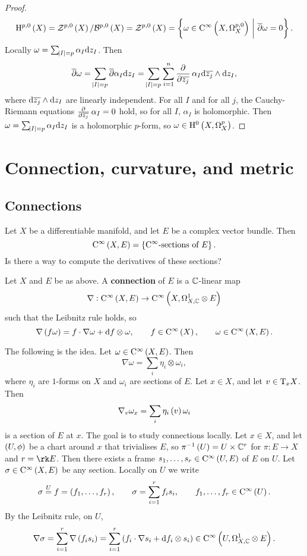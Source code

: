 \begin{proof}
$$ \H^{p, 0}\br{X} = \ZZZ^{p, 0}\br{X} / \BBB^{p, 0}\br{X} = \ZZZ^{p, 0}\br{X} = \cbr{\omega \in \C^\infty\br{X, \Omega_X^{p, 0}} \st \overline{\partial}\omega = 0}. $$
Locally $ \omega = \sum_{\abs{I} = p} \alpha_I\mathrm{d} z_I $. Then
$$ \overline{\partial}\omega = \sum_{\abs{I} = p} \overline{\partial}\alpha_I \d z_I = \sum_{\abs{I} = p} \sum_{i = 1}^n \dpd{}{\overline{z_j}}\alpha_I \d\overline{z_j} \wedge \d z_I, $$
where $ \mathrm{d}\overline{z_j} \wedge \mathrm{d} z_I $ are linearly independent. For all $ I $ and for all $ j $, the Cauchy-Riemann equations $ \tpd{}{\overline{z_j}}\alpha_I = 0 $ hold, so for all $ I $, $ \alpha_I $ is holomorphic. Then $ \omega = \sum_{\abs{I} = p} \alpha_I \mathrm{d} z_I $ is a holomorphic $ p $-form, so $ \omega \in \H^0\br{X, \Omega_X^p} $.
\end{proof}

\pagebreak

\section{Connection, curvature, and metric}

\subsection{Connections}

Let $ X $ be a differentiable manifold, and let $ E $ be a complex vector bundle. Then
$$ \C^\infty\br{X, E} = \cbr{\text{$ \C^\infty $-sections of} \ E}. $$
Is there a way to compute the derivatives of these sections?

\begin{definition}
Let $ X $ and $ E $ be as above. A \textbf{connection} of $ E $ is a $ \mathbb{C} $-linear map
$$ \nabla : \C^\infty\br{X, E} \to \C^\infty\br{X, \Omega_{X, \CC}^1 \otimes E} $$
such that the Leibnitz rule holds, so
$$ \nabla\br{f\omega} = f \cdot \nabla\omega + \d f \otimes \omega, \qquad f \in \C^\infty\br{X}, \qquad \omega \in \C^\infty\br{X, E}. $$
\end{definition}

The following is the idea. Let $ \omega \in \C^\infty\br{X, E} $. Then
$$ \nabla\omega = \sum_i \eta_i \otimes \omega_i, $$
where $ \eta_i $ are $ 1 $-forms on $ X $ and $ \omega_i $ are sections of $ E $. Let $ x \in X $, and let $ v \in \mathrm{T}_xX $. Then
$$ \nabla_v\omega_x = \sum_i \eta_i\br{v}\omega_i $$
is a section of $ E $ at $ x $. The goal is to study connections locally. Let $ x \in X $, and let $ \br{U, \phi} $ be a chart around $ x $ that trivialises $ E $, so $ \pi^{-1}\br{U} = U \times \CC^r $ for $ \pi : E \to X $ and $ r = \rk E $. Then there exists a frame $ s_1, \dots, s_r \in \C^\infty\br{U, E} $ of $ E $ on $ U $. Let $ \sigma \in \C^\infty\br{X, E} $ be any section. Locally on $ U $ we write
$$ \sigma \overset{U}{=} f = \br{f_1, \dots, f_r}, \qquad \sigma = \sum_{i = 1}^r f_is_i, \qquad f_1, \dots, f_r \in \C^\infty\br{U}. $$
By the Leibnitz rule, on $ U $,
$$ \nabla\sigma = \sum_{i = 1}^r \nabla\br{f_is_i} = \sum_{i = 1}^r \br{f_i \cdot \nabla s_i + \d f_i \otimes s_i} \in \C^\infty\br{U, \Omega_{X, \CC}^1 \otimes E}. $$

